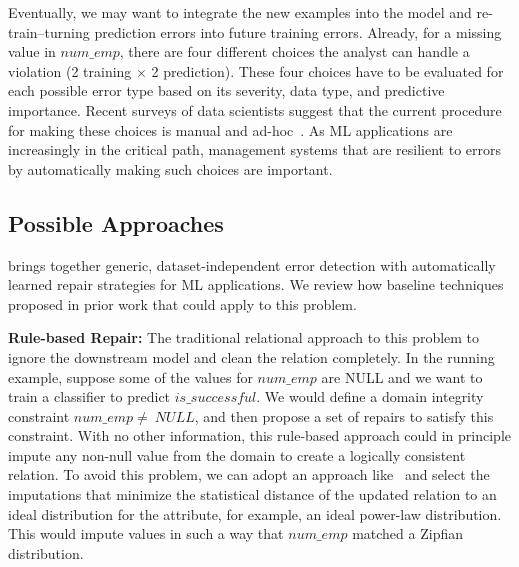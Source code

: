 
\vspace{0.5em}

Eventually, we may want to integrate the new examples into the model and re-train--turning prediction errors into future training errors.
Already, for a missing value in $num\_emp$, there are four different choices the analyst can handle a violation (2 training $\times$ 2 prediction).
These four choices have to be evaluated for each possible error type based on its severity, data type, and predictive importance.
Recent surveys of data scientists suggest that the current procedure for making these choices is manual and ad-hoc~\cite{kandel2012, krishnan2016hilda}.
As ML applications are increasingly in the critical path, management systems that are resilient to errors by automatically making such choices are important.

\subsection{Possible Approaches}
\sys brings together generic, dataset-independent error detection with automatically learned repair strategies for ML applications.
We review how baseline techniques proposed in prior work that could apply to this problem.

\vspace{0.5em}

\noindent\textbf{Rule-based Repair: } 
The traditional relational approach to this problem to ignore the downstream model and clean the relation completely.
In the running example, suppose some of the values for $num\_emp$ are NULL and we want to train a classifier to predict $is\_successful$.
We would define a domain integrity constraint $num\_emp \ne~NULL$, and then propose a set of repairs to satisfy this constraint.
With no other information, this rule-based approach could in principle impute any non-null value from the domain to create a logically consistent relation.
To avoid this problem, we can adopt an approach like~\cite{prokoshyna2015combining} and select the imputations that minimize the statistical distance of the updated relation to an ideal distribution for the attribute, for example, an ideal power-law distribution.
This would impute values in such a way that $num\_emp$ matched a Zipfian distribution.

